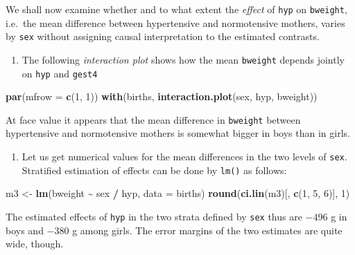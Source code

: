 \documentclass[
]{book}
\newenvironment{Shaded}{\begin{snugshade}}{\end{snugshade}}
\newcommand{\AttributeTok}[1]{\textcolor[rgb]{0.13,0.29,0.53}{#1}}
\newcommand{\DecValTok}[1]{\textcolor[rgb]{0.00,0.00,0.81}{#1}}
\newcommand{\FunctionTok}[1]{\textcolor[rgb]{0.13,0.29,0.53}{\textbf{#1}}}
\newcommand{\NormalTok}[1]{#1}
\newcommand{\OtherTok}[1]{\textcolor[rgb]{0.56,0.35,0.01}{#1}}
\newcommand{\SpecialCharTok}[1]{\textcolor[rgb]{0.81,0.36,0.00}{\textbf{#1}}}
\providecommand{\tightlist}{%
  \setlength{\itemsep}{0pt}\setlength{\parskip}{0pt}}
\begin{document}
We shall now examine whether and to what extent the
\emph{effect} of \texttt{hyp} on \texttt{bweight}, i.e.~the
mean difference between hypertensive and normotensive mothers,
varies by \texttt{sex} without assigning
causal interpretation to the estimated contrasts.

\begin{enumerate}
\def\labelenumi{\arabic{enumi}.}
\tightlist
\item
  The following \emph{interaction plot}
  shows how the mean \texttt{bweight} depends jointly on \texttt{hyp} and \texttt{gest4}
\end{enumerate}

\begin{Shaded}
\begin{Highlighting}[]
\FunctionTok{par}\NormalTok{(}\AttributeTok{mfrow =} \FunctionTok{c}\NormalTok{(}\DecValTok{1}\NormalTok{, }\DecValTok{1}\NormalTok{))}
\FunctionTok{with}\NormalTok{(births, }\FunctionTok{interaction.plot}\NormalTok{(sex, hyp, bweight))}
\end{Highlighting}
\end{Shaded}

At face value it appears that the mean difference in \texttt{bweight} between
hypertensive and normotensive
mothers is somewhat bigger in boys than in girls.

\begin{enumerate}
\def\labelenumi{\arabic{enumi}.}
\setcounter{enumi}{1}
\tightlist
\item
  Let us get numerical values for the mean differences
  in the two levels of \texttt{sex}.
  Stratified estimation of effects can be done by \texttt{lm()} as follows:
\end{enumerate}

\begin{Shaded}
\begin{Highlighting}[]
\NormalTok{m3 }\OtherTok{\textless{}{-}} \FunctionTok{lm}\NormalTok{(bweight }\SpecialCharTok{\textasciitilde{}}\NormalTok{ sex }\SpecialCharTok{/}\NormalTok{ hyp, }\AttributeTok{data =}\NormalTok{ births)}
\FunctionTok{round}\NormalTok{(}\FunctionTok{ci.lin}\NormalTok{(m3)[, }\FunctionTok{c}\NormalTok{(}\DecValTok{1}\NormalTok{, }\DecValTok{5}\NormalTok{, }\DecValTok{6}\NormalTok{)], }\DecValTok{1}\NormalTok{)}
\end{Highlighting}
\end{Shaded}

The estimated effects of \texttt{hyp} in the two strata defined by \texttt{sex} thus
are \(-496\) g in boys and \(-380\) g among girls.
The error margins of the two estimates are quite wide, though.
\end{document}
